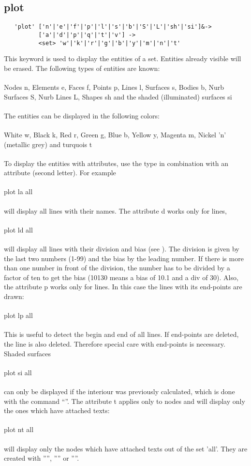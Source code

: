 \documentclass{article}
\begin{document}
\subsection{\label{plot}plot}
\begin{verbatim}
   'plot' ['n'|'e'|'f'|'p'|'l'|'s'|'b'|'S'|'L'|'sh'|'si']&->
          ['a'|'d'|'p'|'q'|'t'|'v'] ->
          <set> 'w'|'k'|'r'|'g'|'b'|'y'|'m'|'n'|'t' 
\end{verbatim}
This keyword is used to display the entities of a set. Entities already visible will be erased. The following types of entities are known:\\\\
Nodes n, Elements e, Faces f, Points p, Lines l, Surfaces s, Bodies b, Nurb Surfaces S, Nurb Lines L, Shapes sh and the shaded (illuminated) surfaces si\\\\The entities can be displayed in the following colors:\\\\
White w, Black k, Red r, Green g, Blue b, Yellow y, Magenta m, Nickel 'n' (metallic grey) and turquois t\\\\ To display the entities with attributes, use the type in combination with an attribute (second letter). For example\\\\
plot la all\\\\will display all lines with their names. The attribute d works only for lines,\\\\plot ld all\\\\ will display all lines with their division and bias (see ). The division is given by the last two numbers (1-99) and the bias by the leading number. If there is more than one number in front of the division, the number has to be divided by a factor of ten to get the bias (10130 means a bias of 10.1 and a div of 30). Also, the attribute p works only for lines. In this case the lines with its end-points are drawn:\\\\plot lp all\\\\This is useful to detect the begin and end of all lines. If end-points are deleted, the line is also deleted. Therefore special care with end-points is necessary. Shaded surfaces\\\\plot si all\\\\ can only be displayed if the interiour was previously calculated, which is done with the command ``''. The attribute t applies only to nodes and will display only the ones which have attached texts:\\\\plot nt all\\\\will display only the nodes which have attached texts out of the set 'all'. They are created with '''', '''' or ''''.
\end{document}
